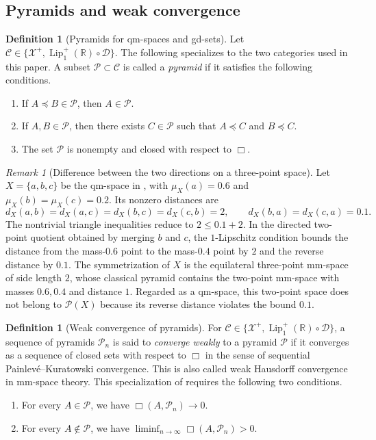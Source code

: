 \documentclass{amsart}
\theoremstyle{plain}
\theoremstyle{definition}
\newtheorem{definition}[theorem]{Definition}
\theoremstyle{remark}
\newtheorem{remark}[theorem]{Remark}
\newcommand{\R}{\mathbb{R}}
\newcommand{\D}{\mathcal{D}}
\newcommand{\Xp}{\mathcal{X}^{+}}
\newcommand{\Lup}{\operatorname{Lip}^{+}_{1}(\R)}
\begin{document}
\subsection{Pyramids and weak convergence}

\begin{definition}[Pyramids for qm-spaces and gd-sets]
\label{def:qm-pyramid}
Let $\mathcal C\in\{\Xp,\Lup\circ\D\}$. The following specializes  to the two categories used in this paper. A subset $\mathcal P\subset\mathcal C$ is called a \emph{pyramid} if it satisfies the following conditions.
\begin{enumerate}[label=\textup{(\roman*)}]
\item If $A\preceq B\in\mathcal P$, then $A\in\mathcal P$.
\item If $A,B\in\mathcal P$, then there exists $C\in\mathcal P$ such that $A\preceq C$ and $B\preceq C$.
\item The set $\mathcal P$ is nonempty and closed with respect to $\Box$.
\end{enumerate}
\end{definition}

\begin{remark}[Difference between the two directions on a three-point space]
\label{rem:three-point-directed-obstruction}
Let $X=\{a,b,c\}$ be the qm-space in , with $\mu_X(a)=0.6$ and $\mu_X(b)=\mu_X(c)=0.2$. Its nonzero distances are
\[d_X(a,b)=d_X(a,c)=d_X(b,c)=d_X(c,b)=2,\qquad d_X(b,a)=d_X(c,a)=0.1.\]
The nontrivial triangle inequalities reduce to $2\leq0.1+2$. In the directed two-point quotient obtained by merging $b$ and $c$, the $1$-Lipschitz condition bounds the distance from the mass-$0.6$ point to the mass-$0.4$ point by $2$ and the reverse distance by $0.1$. The symmetrization of $X$ is the equilateral three-point mm-space of side length $2$, whose classical pyramid contains the two-point mm-space with masses $0.6,0.4$ and distance $1$. Regarded as a qm-space, this two-point space does not belong to $\mathcal P(X)$ because its reverse distance violates the bound $0.1$.
\end{remark}

\begin{definition}[Weak convergence of pyramids]
\label{def:qm-pyramid-weak-convergence}
For $\mathcal C\in\{\Xp,\Lup\circ\D\}$, a sequence of pyramids $\mathcal P_n$ is said to \emph{converge weakly} to a pyramid $\mathcal P$ if it converges as a sequence of closed sets with respect to $\Box$ in the sense of sequential Painlev\'e--Kuratowski convergence. This is also called weak Hausdorff convergence in mm-space theory. This specialization of  requires the following two conditions.
\begin{enumerate}[label=\textup{(\roman*)}]
\item For every $A\in\mathcal P$, we have $\Box(A,\mathcal P_n)\to0$.
\item For every $A\notin\mathcal P$, we have $\liminf_{n\to\infty}\Box(A,\mathcal P_n)>0$.
\end{enumerate}
\end{definition}
\end{document}
